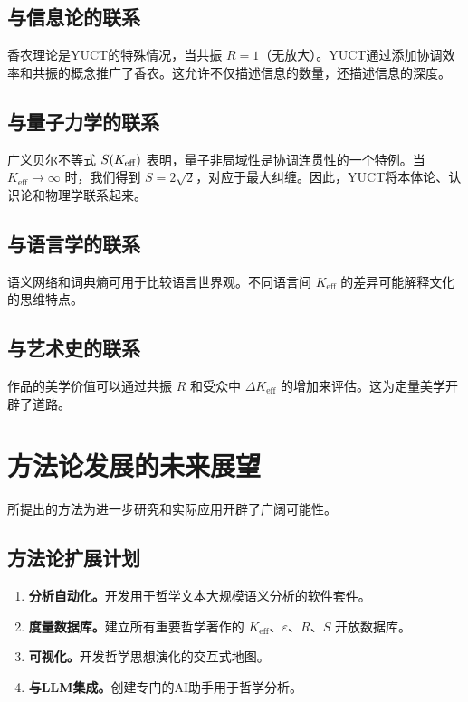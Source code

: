 \documentclass[11pt,a4paper]{article}
\newcommand{\eps}{\varepsilon}
\begin{document}
	\subsection{与信息论的联系}
	
	香农理论是YUCT的特殊情况，当共振 \(R = 1\)（无放大）。YUCT通过添加协调效率和共振的概念推广了香农。这允许不仅描述信息的数量，还描述信息的深度。
	
	\subsection{与量子力学的联系}
	
	广义贝尔不等式 \(S(\Keff)\) 表明，量子非局域性是协调连贯性的一个特例。当 \(K_{\mathrm{eff}} \to \infty\) 时，我们得到 \(S = 2\sqrt{2}\)，对应于最大纠缠。因此，YUCT将本体论、认识论和物理学联系起来。
	
	\subsection{与语言学的联系}
	
	语义网络和词典熵可用于比较语言世界观。不同语言间 \(K_{\mathrm{eff}}\) 的差异可能解释文化的思维特点。
	
	\subsection{与艺术史的联系}
	
	作品的美学价值可以通过共振 \(R\) 和受众中 \(\Delta K_{\mathrm{eff}}\) 的增加来评估。这为定量美学开辟了道路。
	
	\section{方法论发展的未来展望}
	\label{sec:future-directions}
	
	所提出的方法为进一步研究和实际应用开辟了广阔可能性。
	
	\subsection{方法论扩展计划}
	
	\begin{enumerate}
		\item \textbf{分析自动化。}开发用于哲学文本大规模语义分析的软件套件。
		\item \textbf{度量数据库。}建立所有重要哲学著作的 \(K_{\mathrm{eff}}\)、\(\eps\)、\(R\)、\(S\) 开放数据库。
		\item \textbf{可视化。}开发哲学思想演化的交互式地图。
		\item \textbf{与LLM集成。}创建专门的AI助手用于哲学分析。
	\end{enumerate}
	
\end{document}
